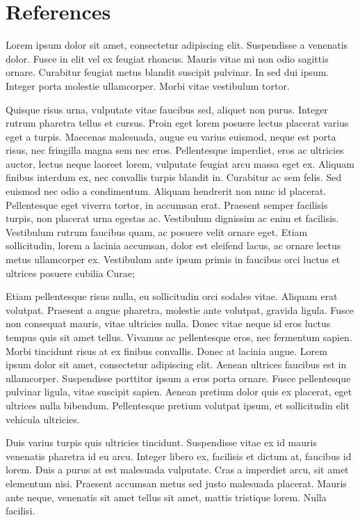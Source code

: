 \chapter{References}
\label{references}

Lorem ipsum dolor sit amet, consectetur adipiscing elit. Suspendisse a venenatis dolor. Fusce in elit vel ex feugiat rhoncus. Mauris vitae mi non odio sagittis ornare. Curabitur feugiat metus blandit suscipit pulvinar. In sed dui ipsum. Integer porta molestie ullamcorper. Morbi vitae vestibulum tortor.

Quisque risus urna, vulputate vitae faucibus sed, aliquet non purus. Integer rutrum pharetra tellus et cursus. Proin eget lorem posuere lectus placerat varius eget a turpis. Maecenas malesuada, augue eu varius euismod, neque est porta risus, nec fringilla magna sem nec eros. Pellentesque imperdiet, eros ac ultricies auctor, lectus neque laoreet lorem, vulputate feugiat arcu massa eget ex. Aliquam finibus interdum ex, nec convallis turpis blandit in. Curabitur ac sem felis. Sed euismod nec odio a condimentum. Aliquam hendrerit non nunc id placerat. Pellentesque eget viverra tortor, in accumsan erat. Praesent semper facilisis turpis, non placerat urna egestas ac. Vestibulum dignissim ac enim et facilisis. Vestibulum rutrum faucibus quam, ac posuere velit ornare eget. Etiam sollicitudin, lorem a lacinia accumsan, dolor est eleifend lacus, ac ornare lectus metus ullamcorper ex. Vestibulum ante ipsum primis in faucibus orci luctus et ultrices posuere cubilia Curae;

Etiam pellentesque risus nulla, eu sollicitudin orci sodales vitae. Aliquam erat volutpat. Praesent a augue pharetra, molestie ante volutpat, gravida ligula. Fusce non consequat mauris, vitae ultricies nulla. Donec vitae neque id eros luctus tempus quis sit amet tellus. Vivamus ac pellentesque eros, nec fermentum sapien. Morbi tincidunt risus at ex finibus convallis. Donec at lacinia augue. Lorem ipsum dolor sit amet, consectetur adipiscing elit. Aenean ultrices faucibus est in ullamcorper. Suspendisse porttitor ipsum a eros porta ornare. Fusce pellentesque pulvinar ligula, vitae suscipit sapien. Aenean pretium dolor quis ex placerat, eget ultrices nulla bibendum. Pellentesque pretium volutpat ipsum, et sollicitudin elit vehicula ultricies.

Duis varius turpis quis ultricies tincidunt. Suspendisse vitae ex id mauris venenatis pharetra id eu arcu. Integer libero ex, facilisis et dictum at, faucibus id lorem. Duis a purus at est malesuada vulputate. Cras a imperdiet arcu, sit amet elementum nisi. Praesent accumsan metus sed justo malesuada placerat. Mauris ante neque, venenatis sit amet tellus sit amet, mattis tristique lorem. Nulla facilisi.

